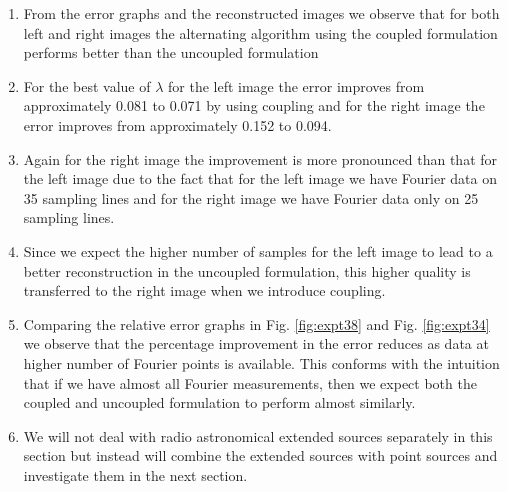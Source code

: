 \begin{enumerate}
\item From the error graphs and the reconstructed images we observe that for both left and right images the alternating algorithm using the coupled formulation performs better than the uncoupled formulation
\item For the best value of $\lambda$ for the left image the error improves from approximately 0.081 to 0.071 by using coupling and for the right image the error improves from approximately 0.152 to 0.094.
\item Again for the right image the improvement is more pronounced than that for the left image due to the fact that for the left image we have Fourier data on 35 sampling lines and for the right image we have Fourier data only on 25 sampling lines.
\item   Since we expect the higher number of samples for the left image to lead to a better reconstruction in the uncoupled formulation, this higher quality is transferred to the right image when we introduce coupling.
\item Comparing the relative error graphs in Fig. \ref{fig:expt38} and Fig. \ref{fig:expt34} we observe that the percentage improvement in the error reduces as data at higher number of Fourier points is available. This conforms with the intuition that if we have almost all Fourier measurements, then we expect both the coupled and uncoupled formulation to perform almost similarly. 
\item We will not deal with radio astronomical extended sources separately in this section but instead will combine the extended sources with point sources and investigate them in the next section.
\end{enumerate}


